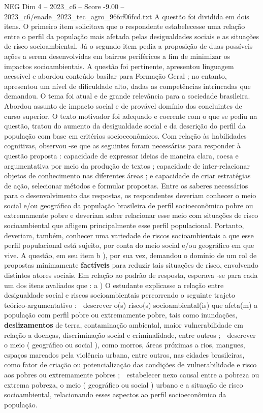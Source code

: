 \begin{textsample}{NEG Dim 4 – 2023\_c6 – Score -9.00 – 2023\_c6/enade\_2023\_tec\_agro\_96fcf06fcd.txt}
A questão foi dividida em dois itens.
O primeiro item solicitava que o respondente estabelecesse uma relação entre o perfil da população mais afetada pelas desigualdades sociais e as situações de risco socioambiental.
Já o segundo item pedia a proposição de duas possíveis ações a serem desenvolvidas em bairros periféricos a fim de minimizar os impactos socioambientais.
A questão foi pertinente, apresentou linguagem acessível e abordou conteúdo basilar para Formação Geral ; no entanto, apresentou um nível de dificuldade alto, dadas as competências intrincadas que demandou.
O tema foi atual e de grande relevância para a sociedade brasileira.
Abordou assunto de impacto social e de provável domínio dos concluintes de curso superior.
O texto motivador foi adequado e coerente com o que se pediu na questão, tratou do aumento da desigualdade social e da descrição do perfil da população com base em critérios socioeconômicos.
Com relação às habilidades cognitivas, observou -se que as seguintes foram necessárias para responder à questão proposta : capacidade de expressar ideias de maneira clara, coesa e argumentativa por meio da produção de textos ; capacidade de inter-relacionar objetos de conhecimento nas diferentes áreas ; e capacidade de criar estratégias de ação, selecionar métodos e formular propostas.
Entre os saberes necessários para o desenvolvimento das respostas, os respondentes deveriam conhecer o meio social e/ou geográfico da população brasileira de perfil socioeconômico pobre ou extremamente pobre e deveriam saber relacionar esse meio com situações de risco socioambiental que afligem principalmente esse perfil populacional.
Portanto, deveriam, também, conhecer uma variedade de riscos socioambientais a que esse perfil populacional está sujeito, por conta do meio social e/ou geográfico em que vive.
A questão, em seu item b ), por sua vez, demandou o domínio de um rol de propostas minimamente \textbf{factíveis} para reduzir tais situações de risco, envolvendo distintos atores sociais.
Em relação ao padrão de resposta, esperava -se para cada um dos itens avaliados que : a ) O estudante explicasse a relação entre desigualdade social e riscos socioambientais percorrendo o seguinte trajeto teórico-argumentativo :  descrever o(s) risco(s) socioambiental(is) que afeta(m) a população com perfil pobre ou extremamente pobre, tais como inundações, \textbf{deslizamentos} de terra, contaminação ambiental, maior vulnerabilidade em relação a doenças, discriminação social e criminalidade, entre outros ;  descrever o meio ( geográfico ou social ), como morros, áreas próximas a rios, mangues, espaços marcados pela violência urbana, entre outros, nas cidades brasileiras, como fator de criação ou potencialização das condições de vulnerabilidade e risco aos pobres ou extremamente pobres ;  estabelecer nexo causal entre a pobreza ou extrema pobreza, o meio ( geográfico ou social ) urbano e a situação de risco socioambiental, relacionando esses aspectos ao perfil socioeconômico da população.

\end{textsample}
